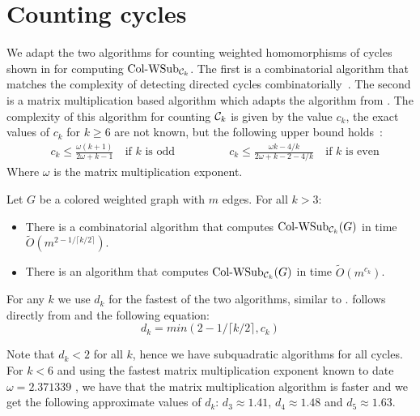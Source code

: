\documentclass[a4paper,UKenglish,cleveref, autoref, numberwithinsect, thm-restate]{lipics-v2021}
\newcommand{\cycle}[1]{\cC_{#1}}
\newcommand{\WSub}[2]{\mathrm{\text{Col-WSub}}_{#2}(#1)}
\newcommand{\WSubNI}[1]{\mathrm{\text{Col-WSub}}_{#1}}
\newcommand{\cC}{{\cal C}}
\begin{document}
	\section{Counting cycles} \label{sec:wsub}
	
	We adapt the two algorithms for counting weighted homomorphisms of cycles shown in \cite{GiLeSh+23} for computing $\WSubNI{\cycle{k}}$. The first is a combinatorial algorithm that matches the complexity of detecting directed cycles combinatorially~\cite{AlYuZw97}. The second is a matrix multiplication based algorithm which adapts the algorithm from \cite{YuZw04}. The complexity of this algorithm for counting $\cycle{k}$ is given by the value $c_k$, the exact values of $c_k$ for $k\geq 6$ are not known, but the following upper bound holds~\cite{DaVuWi19}:
	\begin{equation}
	\begin{split} 
		&c_k \leq \frac{\omega(k+1)}{2\omega+k-1}\ &\text{if $k$ is odd} \qquad\qquad
		&c_k \leq \frac{\omega k - 4/k}{2 \omega + k - 2 - 4/k}\ &\text{if $k$ is even}
	\end{split}
	\end{equation}
	Where $\omega$ is the matrix multiplication exponent.
	\begin{lemma} \label{lem:wsub_cycles}
		Let $G$ be a colored weighted graph with $m$ edges. For all $k>3$:
		\begin{itemize}
			\item There is a combinatorial algorithm that computes $\WSub{G}{\cycle{k}}$ in time $\tilde{O}(m^{2-1/\lceil k/2 \rceil })$.
			\item There is an algorithm that computes $\WSub{G}{\cycle{k}}$ in time $\tilde{O}(m^{c_k})$.
		\end{itemize}
	\end{lemma}

	For any $k$ we use $d_k$ for the fastest of the two algorithms, similar to \cite{GiLeSh+23}.  follows directly from  and the following equation:
	\begin{equation} \label{eq:dk}
		d_k = min(2-1/\lceil k/2 \rceil,c_k)
	\end{equation}

	Note that $d_k < 2$ for all $k$, hence we have subquadratic algorithms for all cycles. For $k<6$ and using the fastest matrix multiplication exponent known to date $\omega = 2.371339$ \cite{AlDuWi+25}, we have that the matrix multiplication algorithm is faster and we get the following approximate values of $d_k$: $d_3 \approx 1.41$, $d_4 \approx 1.48$ and $d_5 \approx 1.63$.
	
\end{document}

